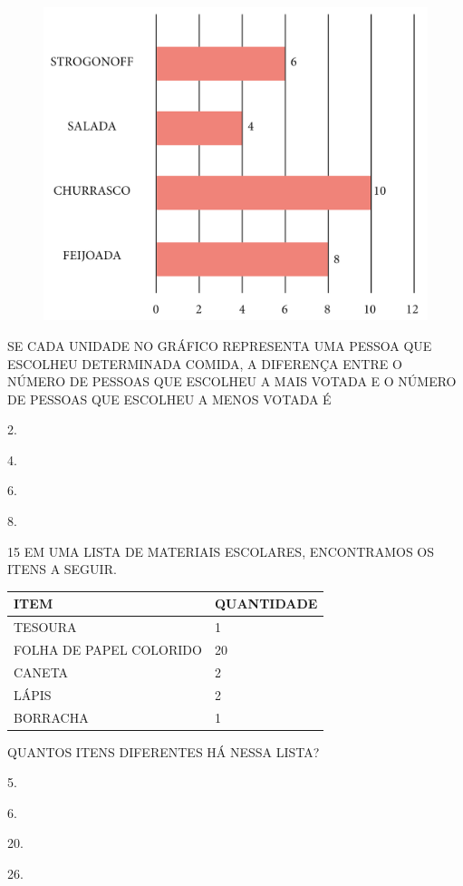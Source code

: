 \begin{figure}[H]
\centering
\includegraphics[width=\textwidth]{./media/SAEB_1ANO_MAT_FIGURA141.png}
\end{figure}

SE CADA UNIDADE NO GRÁFICO REPRESENTA UMA PESSOA QUE ESCOLHEU DETERMINADA COMIDA,
A DIFERENÇA ENTRE O NÚMERO DE PESSOAS QUE ESCOLHEU A MAIS VOTADA E O NÚMERO DE
PESSOAS QUE ESCOLHEU A MENOS VOTADA É

\begin{escolha}[itemsep=-5pt]
\item 2.

\item 4.

\item 6.

\item 8.
\end{escolha}


\num{15} EM UMA LISTA DE MATERIAIS ESCOLARES, ENCONTRAMOS OS ITENS A SEGUIR.


\begin{table}[!ht]
    \centering
    \begin{tabular}{|l|l|}
    \hline
        \textbf{ITEM} & \textbf{QUANTIDADE} \\ \hline
        TESOURA & 1 \\ \hline
        FOLHA DE PAPEL COLORIDO & 20 \\ \hline
        CANETA & 2 \\ \hline
        LÁPIS & 2 \\ \hline
        BORRACHA & 1 \\ \hline
    \end{tabular}
\end{table}

QUANTOS ITENS DIFERENTES HÁ NESSA LISTA?

\begin{escolha}[itemsep=0pt]
\item 5.

\item 6.

\item 20.

\item 26.
\end{escolha}